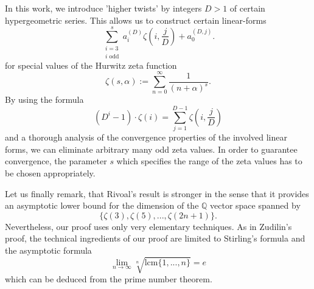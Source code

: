 \documentclass[11pt]{amsart}
\theoremstyle{plain}
\theoremstyle{remark}
\theoremstyle{definition}
\newcommand{\QQ}{\mathbb{Q}}
\newcommand{\lcm}{\mathrm{lcm}}
\begin{document}
In this work, we introduce 'higher twists' by integers $D>1$ of certain hypergeometric series. This allows us to construct certain linear-forms 
\[
	\sum_{\substack{i=3 \\ i \text{ odd}}}^s a^{(D)}_i\zeta\left(i,\frac{j}{D}\right)+a^{(D,j)}_0.
\]
for special values of the Hurwitz zeta function
\[
	\zeta\left(s,\alpha\right):=\sum_{n=0}^\infty\frac{1}{(n+\alpha)^s}.
\]
By using the formula
\[
	(D^i-1)\cdot\zeta(i)=\sum_{j=1}^{D-1}\zeta\left(i,\frac{j}{D}\right)
\]
and a thorough analysis of the convergence properties of the involved linear forms, we can eliminate arbitrary many odd zeta values. In order to guarantee convergence, the parameter $s$ which specifies the range of the zeta values has to be chosen appropriately. \par 
Let us finally remark, that Rivoal's result is stronger in the sense that it provides an asymptotic lower bound for the dimension of the $\QQ$ vector space spanned by
\[
	\{\zeta(3),\zeta(5),...,\zeta(2n+1)\}.
\]
Nevertheless, our proof uses only very elementary techniques. As in Zudilin's proof, the technical ingredients of our proof are limited to Stirling's formula and the asymptotic formula
\[
	\lim_{n\rightarrow \infty} \sqrt[n]{\lcm\{1,...,n\}}=e
\]
which can be deduced from the prime number theorem.\par 
\end{document}
